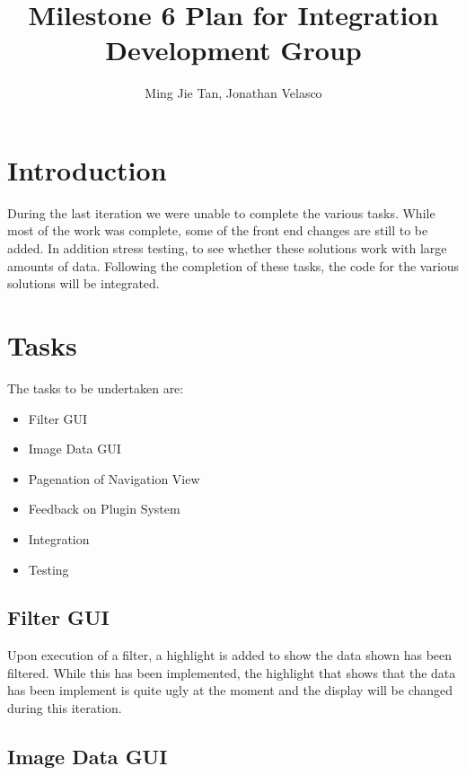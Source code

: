 \documentclass{article}
\begin{document}
\title{\textbf{Milestone 6 Plan for Integration Development Group}}\author{Ming Jie Tan, Jonathan Velasco}

\maketitle
\thispagestyle{empty}
\newpage{}

\thispagestyle{empty}
\tableofcontents
\newpage{}

\setcounter{page}{1}
\section{Introduction}

During the last iteration we were unable to complete the various tasks. While most of the work was complete, some of the front end changes are still to be added. In addition stress testing, to see whether these solutions work with large amounts of data. Following the completion of these tasks, the code for the various solutions will be integrated.

\newpage{}
\section{Tasks}

The tasks to be undertaken are:
\begin{itemize}
	\item Filter GUI
	\item Image Data GUI
	\item Pagenation of Navigation View
	\item Feedback on Plugin System
	\item Integration
	\item Testing
\end{itemize}

\subsection{Filter GUI}

Upon execution of a filter, a highlight is added to show the data shown has been filtered. While this has been implemented, the highlight that shows that the data has been implement is quite ugly at the moment and the display will be changed during this iteration.

\subsection{Image Data GUI}
\end{document}

